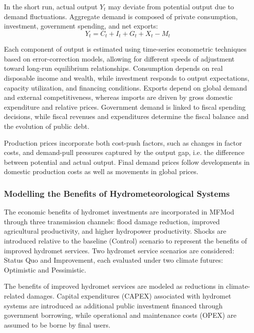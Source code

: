 \documentclass[
  final,
  10pt,
  letterpaper,
  english,
]{article}
\begin{document}
In the short run, actual output $Y_t$ may deviate from potential output due to
demand fluctuations. Aggregate demand is composed of private consumption,
investment, government spending, and net exports:
\begin{equation}
  Y_t = C_t + I_t + G_t + X_t - M_t
\end{equation}

Each component of output is estimated using time-series econometric techniques
based on error-correction models, allowing for different speeds of adjustment
toward long-run equilibrium relationships. Consumption depends on real
disposable income and wealth, while investment responds to output expectations,
capacity utilization, and financing conditions. Exports depend on global demand
and external competitiveness, whereas imports are driven by gross domestic
expenditure and relative prices. Government demand is linked to fiscal spending
decisions, while fiscal revenues and expenditures determine the fiscal balance
and the evolution of public debt.

Production prices incorporate both cost-push factors, such as changes in factor
costs, and demand-pull pressures captured by the output gap, i.e. the difference
between potential and actual output. Final demand prices follow developments in
domestic production costs as well as movements in global prices.


\subsubsection{Modelling the Benefits of Hydrometeorological Systems}
The economic benefits of hydromet investments are incorporated in MFMod through
three transmission channels: flood damage reduction, improved agricultural
productivity, and higher hydropower productivity. Shocks are introduced relative
to the baseline (Control) scenario to represent the benefits of improved
hydromet services. Two hydromet service scenarios are considered: Status Quo and
Improvement, each evaluated under two climate futures: Optimistic and
Pessimistic.

The benefits of improved hydromet services are modeled as reductions in
climate-related damages. Capital expenditures (CAPEX) associated with hydromet
systems are introduced as additional public investment financed through
government borrowing, while operational and maintenance costs (OPEX) are assumed
to be borne by final users.
\end{document}
